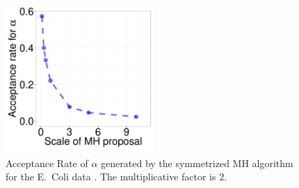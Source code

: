 {\begin{figure}
  \end{figure}

  \begin{figure}[H]
  \centering

  \begin{minipage}[!hp]{0.99\linewidth}
	\centering
    \includegraphics [width=0.50\textwidth, angle=0]{figs/acc/ecolialpha_k2.pdf}
  \end{minipage}
    \caption{Acceptance Rate of $\alpha$ generated by the symmetrized MH algorithm for the E.\ Coli data . The multiplicative factor is $2$. }
     \label{fig:ACC_ECOLI}
  \end{figure}

}
